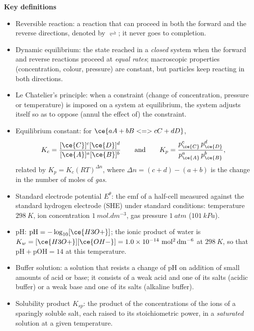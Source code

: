 \documentclass[11pt]{article}
\newcommand{\cle}[1]{{\popxbold\color{popdark}#1}}
\begin{document}
\begin{bilan}
\textbf{Key definitions}
\begin{itemize}
\item \cle{Reversible reaction}: a reaction that can proceed in both the forward and the reverse directions, denoted by $\rightleftharpoons$; it never goes to completion.
\item \cle{Dynamic equilibrium}: the state reached in a \emph{closed} system when the forward and reverse reactions proceed at \emph{equal rates}; macroscopic properties (concentration, colour, pressure) are constant, but particles keep reacting in both directions.
\item \cle{Le Chatelier's principle}: when a constraint (change of concentration, pressure or temperature) is imposed on a system at equilibrium, the system adjusts itself so as to oppose (annul the effect of) the constraint.
\item \cle{Equilibrium constant}: for $\ce{aA + bB <=> cC + dD}$,
\[ K_c=\dfrac{[\ce{C}]^c[\ce{D}]^d}{[\ce{A}]^a[\ce{B}]^b} \qquad\text{and}\qquad K_p=\dfrac{p_{\ce{C}}^{c}\,p_{\ce{D}}^{d}}{p_{\ce{A}}^{a}\,p_{\ce{B}}^{b}}, \]
related by $K_p=K_c(RT)^{\Delta n}$, where $\Delta n=(c+d)-(a+b)$ is the change in the number of moles of \emph{gas}.
\item \cle{Standard electrode potential} $E^\theta$: the emf of a half-cell measured against the standard hydrogen electrode (SHE) under standard conditions: temperature $\SI{298}{K}$, ion concentration $\SI{1}{mol.dm^{-3}}$, gas pressure $\SI{1}{atm}$ ($\SI{101}{kPa}$).
\item \cle{pH}: $\mathrm{pH}=-\log_{10}[\ce{H3O+}]$; the ionic product of water is $K_w=[\ce{H3O+}][\ce{OH-}]=1.0\times10^{-14}\ \mathrm{mol^2\,dm^{-6}}$ at $\SI{298}{K}$, so that $\mathrm{pH}+\mathrm{pOH}=14$ at this temperature.
\item \cle{Buffer solution}: a solution that resists a change of pH on addition of small amounts of acid or base; it consists of a weak acid and one of its salts (acidic buffer) or a weak base and one of its salts (alkaline buffer).
\item \cle{Solubility product} $K_{sp}$: the product of the concentrations of the ions of a sparingly soluble salt, each raised to its stoichiometric power, in a \emph{saturated} solution at a given temperature.
\end{itemize}


\end{bilan}
\end{document}
